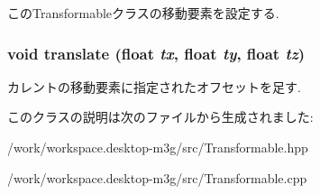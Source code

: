 このTransformableクラスの移動要素を設定する. \hypertarget{classm3g_1_1Transformable_66d493b8307a85e615c4eb89116f2e09}{
\subsubsection[{translate}]{\setlength{\rightskip}{0pt plus 5cm}void translate (float {\em tx}, \/  float {\em ty}, \/  float {\em tz})}}
\label{classm3g_1_1Transformable_66d493b8307a85e615c4eb89116f2e09}


カレントの移動要素に指定されたオフセットを足す. 

このクラスの説明は次のファイルから生成されました:\begin{CompactItemize}
\item 
/work/workspace.desktop-m3g/src/Transformable.hpp\item 
/work/workspace.desktop-m3g/src/Transformable.cpp\end{CompactItemize}
